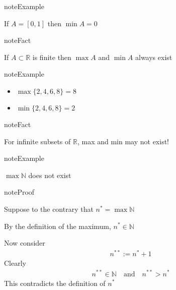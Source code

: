 \documentclass[letterpaper,10pt,english]{jupyterBook}
\begin{document}
\begin{sphinxadmonition}{note}{Example}

\sphinxAtStartPar
If \(A = [0, 1]\) then \(\min A = 0\)
\end{sphinxadmonition}

\begin{sphinxadmonition}{note}{Fact}

\sphinxAtStartPar
If \(A \subset \mathbb{R}\) is finite then \(\max A\) and \(\min A\) always exist
\end{sphinxadmonition}

\begin{sphinxadmonition}{note}{Example}
\begin{itemize}
\item {} 
\sphinxAtStartPar
\(\max\{2, 4, 6, 8\} = 8\)

\item {} 
\sphinxAtStartPar
\(\min\{2, 4, 6, 8\} = 2\)

\end{itemize}
\end{sphinxadmonition}

\begin{sphinxadmonition}{note}{Fact}

\sphinxAtStartPar
For infinite subsets of \(\mathbb{R}\), max and min may not exist!
\end{sphinxadmonition}

\begin{sphinxadmonition}{note}{Example}

\sphinxAtStartPar
\(\max \mathbb{N}\) does not exist
\end{sphinxadmonition}

\begin{sphinxadmonition}{note}{Proof}

\sphinxAtStartPar
Suppose to the contrary that \(n^* = \max \mathbb{N}\)

\sphinxAtStartPar
By the definition of the maximum, \(n^* \in \mathbb{N}\)

\sphinxAtStartPar
Now consider
\begin{equation*}
\begin{split}
%
n^{**} := n^* + 1
%
\end{split}
\end{equation*}
\sphinxAtStartPar
Clearly
\begin{equation*}
\begin{split}
%
n^{**} \in \mathbb{N}
\quad \text{and} \quad 
n^{**} > n^*
%
\end{split}
\end{equation*}
\sphinxAtStartPar
This contradicts the definition of \(n^*\)
\end{sphinxadmonition}
\end{document}

